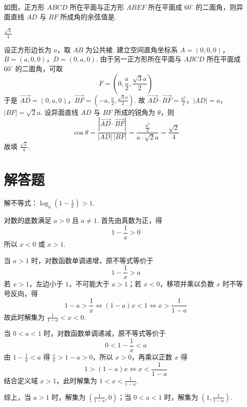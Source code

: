 \documentclass[UTF8,a4paper,oneside,11pt]{ctexbook}
\begin{document}
\begin{problem}
如图，正方形 \(ABCD\) 所在平面与正方形 \(ABEF\) 所在平面成 \(60^{\circ}\) 的二面角，则异面直线 \(AD\) 与 \(BF\) 所成角的余弦值是\fillinblank{}.

\end{problem}

\begin{answer}
\(\frac{\sqrt{2}}{4}\)
\end{answer}

\begin{solution}
设正方形边长为 \(a\)，取 \(AB\) 为公共棱. 建立空间直角坐标系
\(A=(0,0,0)\)，\(B=(a,0,0)\)，\(D=(0,a,0)\).
由于另一正方形所在平面与 \(ABCD\) 所在平面成 \(60^{\circ}\) 的二面角，可取
\[
F=\left(0,\frac a2,\frac{\sqrt3a}{2}\right)
\]
于是
\(\overrightarrow{AD}=(0,a,0)\)，\(\overrightarrow{BF}=\left(-a,\frac a2,\frac{\sqrt3a}{2}\right)\).
故
\(\overrightarrow{AD}\cdot\overrightarrow{BF}=\frac{a^2}{2}\)，\(|AD|=a\)，\(|BF|=\sqrt2a\).
设异面直线 \(AD\) 与 \(BF\) 所成的锐角为 \(\theta\)，则
\[
\cos\theta=\frac{\left|\overrightarrow{AD}\cdot\overrightarrow{BF}\right|}
{|AD|\,|BF|}
=\frac{\frac{a^2}{2}}{a\cdot\sqrt2a}
=\frac{\sqrt2}{4}
\]
故填 \(\frac{\sqrt2}{4}\).
\end{solution}

\section{解答题}

\begin{problem}
解不等式：\(\log_a\left(1 - \frac{1}{x}\right) > 1\).
\end{problem}

\begin{solution}
对数的底数满足 \(a>0\) 且 \(a\neq1\). 首先由真数为正，得
\[
1-\frac1x>0
\]
所以 \(x<0\) 或 \(x>1\).

当 \(a>1\) 时，对数函数单调递增，原不等式等价于
\[
1-\frac1x>a
\]
若 \(x>1\)，左边小于 \(1\)，不可能大于 \(a>1\)；若 \(x<0\)，移项并乘以负数 \(x\) 时不等号反向，得
\[
1-a>\frac1x
\Longleftrightarrow
(1-a)x<1
\Longleftrightarrow
x>\frac1{1-a}
\]
故此时解集为 \(\frac1{1-a}<x<0\).

当 \(0<a<1\) 时，对数函数单调递减，原不等式等价于
\[
0<1-\frac1x<a
\]
由 \(1-\frac1x<a\) 得 \(\frac1x>1-a>0\)，所以 \(x>0\)，再乘以正数 \(x\) 得
\[
1>(1-a)x
\Longleftrightarrow
x<\frac1{1-a}
\]
结合定义域 \(x>1\)，此时解集为 \(1<x<\frac1{1-a}\).

综上，当 \(a>1\) 时，解集为 \(\left(\frac1{1-a},0\right)\)；当 \(0<a<1\) 时，解集为 \(\left(1,\frac1{1-a}\right)\).
\end{solution}
\end{document}
